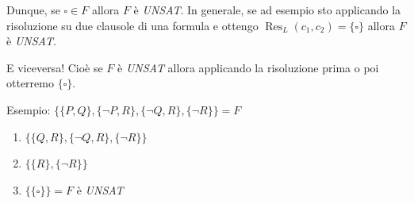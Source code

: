 \documentclass[12pt]{report}
\begin{document}
	Dunque, se $\square \in F$ allora $F$ è \emph{UNSAT}.
	In generale, se ad esempio sto applicando la risoluzione su due clausole di una formula e ottengo $\operatorname{Res}_L(c_1, c_2) = \{\square\}$ allora $F$ è \emph{UNSAT}.
	
	E viceversa! Cioè se $F$ è \emph{UNSAT} allora applicando la risoluzione prima o poi otterremo $\{\square\}$.
	
	Esempio: $\{\{P, Q\}, \{\neg P, R\}, \{\neg Q, R\}, \{\neg R\}\} = F$
	\begin{enumerate}
		\item $\{\{Q, R\}, \{\neg Q, R\}, \{\neg R\}\}$
		\item $\{\{R\}, \{\neg R\}\}$
		\item $\{\{\square\}\} = F$ è \emph{UNSAT}
	\end{enumerate}
	
\end{document}
